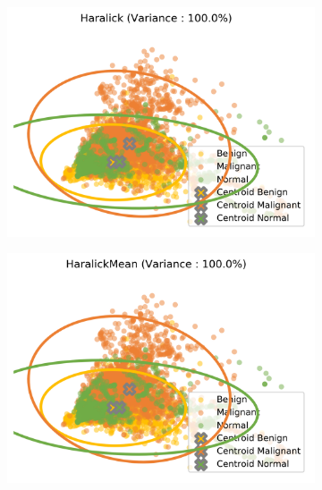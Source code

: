 \begin{figure}[H]
    \begin{subfigure}{.45\textwidth}
      \includegraphics[width=\textwidth]{contents/chapter_4/resources/visualisation_spatial_Haralick.png}
    \end{subfigure}
    \begin{subfigure}{.45\textwidth}
      \includegraphics[width=\textwidth]{contents/chapter_4/resources/visualisation_spatial_HaralickMean.png}
    \end{subfigure}
    

\end{figure}

